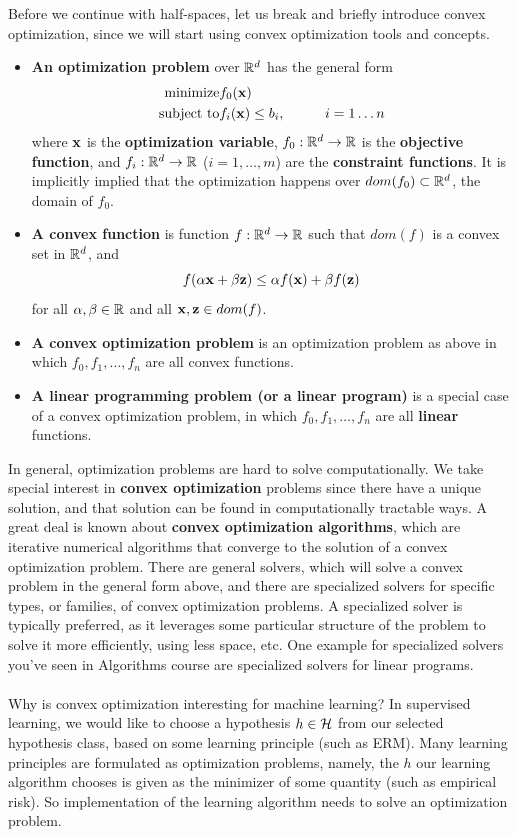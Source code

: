 Before we continue with half-spaces, let us break and briefly introduce convex
optimization, since we will start using convex optimization tools and concepts.

\begin{itemize}
  \item {\bf An optimization problem} over $\mathbb{R}^d$ has the general form
    \begin{eqnarray*}
      \text{minimize} & f_0(\mathbf{x}) & \\
      \text{subject to} & f_i(\mathbf{x}) \leq b_i, & \qquad i=1\ldots n
    \end{eqnarray*}
    where $\mathbf{x}$ is the {\bf optimization variable}, $f_0:\mathbb{R}^d\to\mathbb{R}$ is
    the {\bf objective function},  and  $f_i:\mathbb{R}^d\to\mathbb{R}$ ($i=1,\ldots,m$) are
    the {\bf constraint functions}. It is implicitly implied that 
    the optimization happens over $dom(f_0)\subset
    \mathbb{R}^d$, the domain of $f_0$.
  \item {\bf A convex function} is
    function $f:\mathbb{R}^d\to\mathbb{R}$ such that $dom(f)$ is a
    convex set in $\mathbb{R}^d$, and 
    \[
      f(\alpha \mathbf{x} + \beta \mathbf{z}) \leq  \alpha f(\mathbf{x}) + \beta f(\mathbf{z})
    \]
    for all $\alpha,\beta\in\mathbb{R}$ and all $\mathbf{x},\mathbf{z}\in dom(f)$.

  \item {\bf A convex  optimization problem} is an optimization problem as above
    in which $f_0,f_1,\ldots, f_n$ are all convex functions.
  \item {\bf A linear programming problem (or a linear program)} 
    is a special case of a convex optimization problem, in which 
    $f_0,f_1,\ldots, f_n$ are all {\bf linear} functions.

\end{itemize}


In general, optimization problems are hard to solve computationally. We take
special interest in {\bf convex optimization} problems since there have a unique
solution, and that solution can be found in  computationally tractable ways. A
great deal is known about {\bf convex optimization algorithms}, which are
iterative numerical algorithms that converge to the solution of a convex
optimization problem. There are general solvers, which will solve a convex
problem in the general form above, and there are specialized solvers for specific
types, or families, of convex optimization problems. A specialized solver is
typically preferred, as it leverages some particular structure of the problem to
solve it more efficiently, using less space, etc. One example for specialized
solvers you've seen in Algorithms course are specialized solvers for linear
programs.
\\~\\
Why is convex optimization interesting for machine learning? In supervised
learning, we would like to choose a hypothesis $h\in\mathcal{H}$ from our selected
hypothesis class, based on some learning principle (such as ERM). Many learning
principles are formulated as optimization problems, namely, the $h$ our learning
algorithm chooses is
given as the minimizer of some quantity (such as empirical risk). So
implementation of the
learning algorithm needs to solve an optimization problem. 

